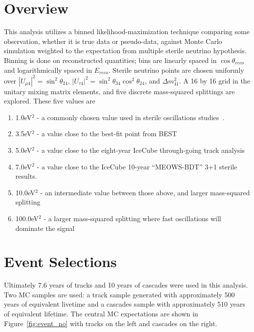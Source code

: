 \documentclass[main.tex]{subfiles}
\begin{document}
\section{Overview}

This analysis utilizes a binned likelihood-maximization technique comparing some observation, whether it is true data or pseudo-data, against Monte Carlo simulation weighted to the expectation from multiple sterile neutrino hypothesis. 
Binning is done on reconstructed quantities; bins are linearly spaced in $\cos\theta_{reco}$ and logarithmically spaced in $E_{reco}$. 
Sterile neutrino points are chosen uniformly over $\left|U_{\mu 4}\right|^{2}=\sin^{2}\theta_{24}$, $\left|U_{\tau 4}\right|^{2}=\sin^{2}\theta_{34}\cos^{2}\theta_{24}$, and $\Delta m_{41}^{2}$. 
A 16 by 16 grid in the unitary mixing matrix elements, and five discrete mass-squared splittings are explored. 
These five values are 
\begin{enumerate}
    \item 1.0eV$^{2}$ - a commonly chosen value used in sterile oscillations studies~\cite{Aartsen_2017_dc, PhysRevD.91.052019, PhysRevD.105.052001}. 
    \item 3.5eV$^{2}$ - a value close to the best-fit point from BEST~\cite{barinov2021results}
    \item 5.0eV$^{2}$ - a value close to the eight-year IceCube through-going track analysis~\cite{Aartsen_2020, Aartsen_2020_prd}
    \item 7.0eV$^{2}$ - a value close to the IceCube 10-year ``MEOWS-BDT'' 3+1 sterile results. 
    \item 10.0eV$^{2}$ - an intermediate value between those above, and larger mass-squared splitting
    \item 100.0eV$^{2}$ - a larger mass-squared splitting where fast oscillations will dominate the signal
\end{enumerate}

\section{Event Selections}

Ultimately 7.6 years of tracks and 10 years of cascades were used in this analysis. 
Two MC samples are used: a track sample generated with approximately 500 years of equivalent livetime and a cascades sample with approximately 510 years of equivalent lifetime.
The central MC expectations are shown in Figure~\ref{fig:event_no} with tracks on the left and cascades on the right. 
\end{document}
